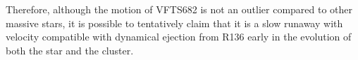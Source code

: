 \documentclass[apjl,twocolumn]{emulateapj}
\newcommand{\SdM}[1]{{{\color{brown}{#1}}}}
\newcommand{\kms}{{\,\mathrm{km\ s^{-1}}}}
\newcommand{\masyr}{\,\mathrm{mas}\,\mathrm{yr}^{-1}}
\DeclareRobustCommand{\Eqref}[1]{Eq.~\ref{#1}}
\DeclareRobustCommand{\Tabref}[1]{Table~\ref{#1}}
\begin{document}
Therefore, although the motion of VFTS682 is not an outlier compared
to other massive stars, it is possible to tentatively claim that it is
a slow runaway with velocity compatible with dynamical ejection from
R136 early in the evolution of both the star and the cluster. 








\end{document}
